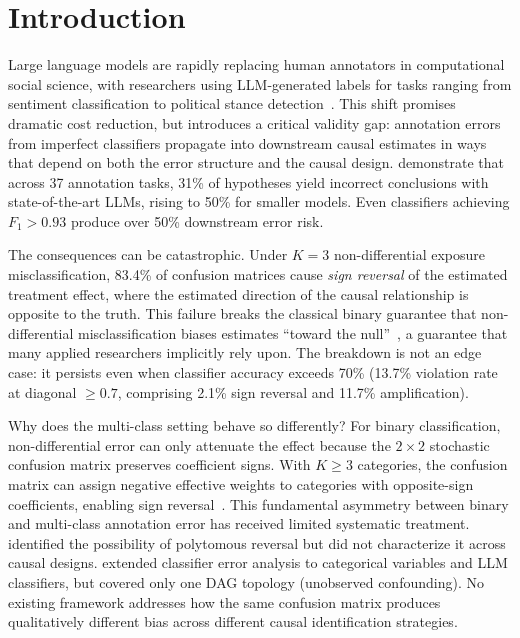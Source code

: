 \section{Introduction}
\label{sec:introduction}

Large language models are rapidly replacing human annotators in computational social science, with researchers using LLM-generated labels for tasks ranging from sentiment classification to political stance detection~\cite{egami_hinck_stewart_wei2023, baumann2025}. This shift promises dramatic cost reduction, but introduces a critical validity gap: annotation errors from imperfect classifiers propagate into downstream causal estimates in ways that depend on both the error structure and the causal design. \citet{baumann2025} demonstrate that across 37 annotation tasks, 31\% of hypotheses yield incorrect conclusions with state-of-the-art LLMs, rising to 50\% for smaller models. Even classifiers achieving $F_1 > 0.93$ produce over 50\% downstream error risk.

The consequences can be catastrophic. Under $K{=}3$ non-differential exposure misclassification, 83.4\% of confusion matrices cause \emph{sign reversal} of the estimated treatment effect, where the estimated direction of the causal relationship is opposite to the truth. This failure breaks the classical binary guarantee that non-differential misclassification biases estimates ``toward the null''~\cite{brenner1993}, a guarantee that many applied researchers implicitly rely upon. The breakdown is not an edge case: it persists even when classifier accuracy exceeds 70\% (13.7\% violation rate at diagonal $\geq 0.7$, comprising 2.1\% sign reversal and 11.7\% amplification).

Why does the multi-class setting behave so differently? For binary classification, non-differential error can only attenuate the effect because the $2{\times}2$ stochastic confusion matrix preserves coefficient signs. With $K \geq 3$ categories, the confusion matrix can assign negative effective weights to categories with opposite-sign coefficients, enabling sign reversal~\cite{veirod_laake2001}. This fundamental asymmetry between binary and multi-class annotation error has received limited systematic treatment. \citet{brenner1993} identified the possibility of polytomous reversal but did not characterize it across causal designs. \citet{lee_wood_doughty2024} extended classifier error analysis to categorical variables and LLM classifiers, but covered only one DAG topology (unobserved confounding). No existing framework addresses how the same confusion matrix produces qualitatively different bias across different causal identification strategies.

